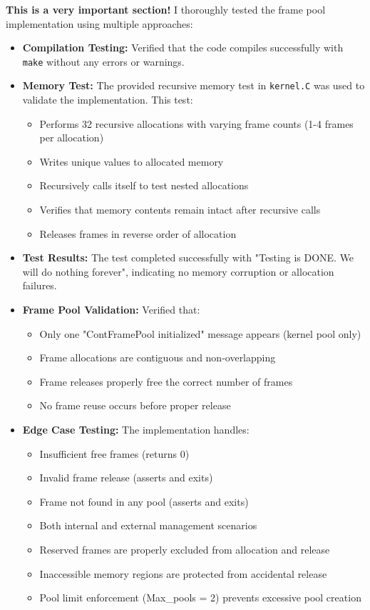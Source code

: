 \documentclass{article}
\begin{document}
\textbf{This is a very important section!} I thoroughly tested the frame pool implementation using multiple approaches:

\begin{itemize}
    \item \textbf{Compilation Testing:} Verified that the code compiles successfully with \texttt{make} without any errors or warnings.
    
    \item \textbf{Memory Test:} The provided recursive memory test in \texttt{kernel.C} was used to validate the implementation. This test:
    \begin{itemize}
        \item Performs 32 recursive allocations with varying frame counts (1-4 frames per allocation)
        \item Writes unique values to allocated memory
        \item Recursively calls itself to test nested allocations
        \item Verifies that memory contents remain intact after recursive calls
        \item Releases frames in reverse order of allocation
    \end{itemize}
    
    \item \textbf{Test Results:} The test completed successfully with "Testing is DONE. We will do nothing forever", indicating no memory corruption or allocation failures.
    
    \item \textbf{Frame Pool Validation:} Verified that:
    \begin{itemize}
        \item Only one "ContFramePool initialized" message appears (kernel pool only)
        \item Frame allocations are contiguous and non-overlapping
        \item Frame releases properly free the correct number of frames
        \item No frame reuse occurs before proper release
    \end{itemize}
    
    \item \textbf{Edge Case Testing:} The implementation handles:
    \begin{itemize}
        \item Insufficient free frames (returns 0)
        \item Invalid frame release (asserts and exits)
        \item Frame not found in any pool (asserts and exits)
        \item Both internal and external management scenarios
        \item Reserved frames are properly excluded from allocation and release
        \item Inaccessible memory regions are protected from accidental release
        \item Pool limit enforcement (Max\_pools = 2) prevents excessive pool creation
    \end{itemize}
\end{itemize}
\end{document}
